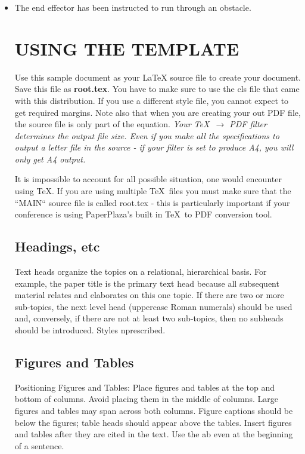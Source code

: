 \documentclass[letterpaper, 10 pt, conference]{ieeeconf}  %
\begin{document}
\begin{itemize}
\item The end effector has been instructed to run through an obstacle.



\section{USING THE TEMPLATE}

Use this sample document as your LaTeX source file to create your document. Save this file as {\bf root.tex}. You have to make sure to use the cls file that came with this distribution. If you use a different style file, you cannot expect to get required margins. Note also that when you are creating your out PDF file, the source file is only part of the equation. {\it Your \TeX\ $\rightarrow$ PDF filter determines the output file size. Even if you make all the specifications to output a letter file in the source - if your filter is set to produce A4, you will only get A4 output. }

It is impossible to account for all possible situation, one would encounter using \TeX. If you are using multiple \TeX\ files you must make sure that the ``MAIN`` source file is called root.tex - this is particularly important if your conference is using PaperPlaza's built in \TeX\ to PDF conversion tool.

\subsection{Headings, etc}

Text heads organize the topics on a relational, hierarchical basis. For example, the paper title is the primary text head because all subsequent material relates and elaborates on this one topic. If there are two or more sub-topics, the next level head (uppercase Roman numerals) should be used and, conversely, if there are not at least two sub-topics, then no subheads should be introduced. Styles nprescribed.

\subsection{Figures and Tables}

Positioning Figures and Tables: Place figures and tables at the top and bottom of columns. Avoid placing them in the middle of columns. Large figures and tables may span across both columns. Figure captions should be below the figures; table heads should appear above the tables. Insert figures and tables after they are cited in the text. Use the ab even at the beginning of a sentence.


\end{itemize}
\end{document}
